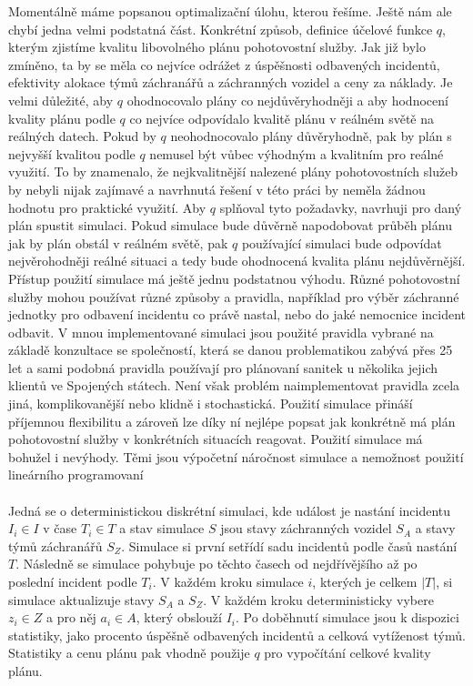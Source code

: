 Momentálně máme popsanou optimalizační úlohu, kterou řešíme. Ještě nám ale chybí jedna velmi podstatná část.
Konkrétní způsob, definice účelové funkce $q$, kterým zjistíme kvalitu libovolného plánu pohotovostní služby.
Jak již bylo zmíněno, ta by se měla co nejvíce odrážet z úspěšnosti odbavených incidentů, efektivity alokace týmů záchranářů a záchranných vozidel a ceny za náklady.
Je velmi důležité, aby $q$ ohodnocovalo plány co nejdůvěryhodněji a aby hodnocení kvality plánu podle $q$ co nejvíce odpovídalo kvalitě plánu v reálném světě na reálných datech.
Pokud by $q$ neohodnocovalo plány důvěryhodně, pak by plán s nejvyšší kvalitou podle $q$ nemusel být vůbec výhodným a kvalitním pro reálné využití.
To by znamenalo, že nejkvalitnější nalezené plány pohotovostních služeb by nebyli nijak zajímavé a navrhnutá řešení v této práci by neměla žádnou hodnotu pro praktické využití.
Aby $q$ splňoval tyto požadavky, navrhuji pro daný plán spustit simulaci.
Pokud simulace bude důvěrně napodobovat průběh plánu jak by plán obstál v reálném světě, pak $q$ používající simulaci
bude odpovídat nejvěrohodněji reálné situaci a tedy bude ohodnocená kvalita plánu nejdůvěrnější.
Přístup použití simulace má ještě jednu podstatnou výhodu.
Různé pohotovostní služby mohou používat různé způsoby a pravidla, například pro výběr záchranné jednotky pro odbavení incidentu co právě nastal, nebo do jaké nemocnice incident odbavit.
V mnou implementované simulaci jsou použité pravidla vybrané na základě konzultace se společností, která se danou problematikou zabývá přes 25 let a sami podobná pravidla používají pro plánovaní sanitek
u několika jejich klientů ve Spojených státech.
Není však problém naimplementovat pravidla zcela jiná, komplikovanější nebo klidně i stochastická.
Použití simulace přináší příjemnou flexibilitu a zároveň lze díky ní nejlépe popsat jak konkrétně má plán pohotovostní služby v konkrétních situacích reagovat.
Použití simulace má bohužel i nevýhody. Těmi jsou výpočetní náročnost simulace a nemožnost použití lineárního programovaní 
\\
\\
Jedná se o deterministickou diskrétní simulaci, kde událost je nastání incidentu $I_i \in I$ v čase $T_i \in T$ a stav simulace $S$
jsou stavy záchranných vozidel $S_A$ a stavy týmů záchranářů $S_Z$.
Simulace si první setřídí sadu incidentů podle časů nastání $T$.
Následně se simulace pohybuje po těchto časech od nejdřívějšího až po poslední incident podle $T_i$.
V každém kroku simulace $i$, kterých je celkem $|T|$, si simulace aktualizuje stavy $S_A$ a $S_Z$.
V každém kroku deterministicky vybere $z_i \in Z$ a pro něj $a_i \in A$, který obslouží $I_i$. 
Po doběhnutí simulace jsou k dispozici statistiky, jako procento úspěšně odbavených incidentů a celková vytíženost týmů.
Statistiky a cenu plánu pak vhodně použije $q$ pro vypočítání celkové kvality plánu.

